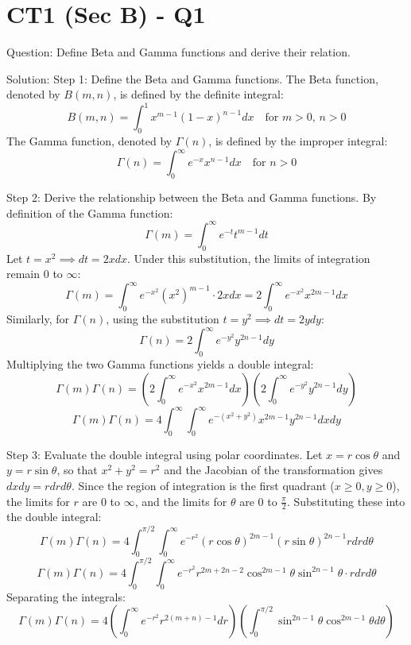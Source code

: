 \documentclass[11pt, a4paper]{article}
\begin{document}

\section*{CT1 (Sec B) - Q1}
Question:
Define Beta and Gamma functions and derive their relation.

Solution:
Step 1: Define the Beta and Gamma functions.
The Beta function, denoted by \(B(m, n)\), is defined by the definite integral:
\[
B(m, n) = \int_{0}^{1} x^{m-1} (1-x)^{n-1} dx \quad \text{for } m > 0, \, n > 0
\]
The Gamma function, denoted by \(\Gamma(n)\), is defined by the improper integral:
\[
\Gamma(n) = \int_{0}^{\infty} e^{-x} x^{n-1} dx \quad \text{for } n > 0
\]

Step 2: Derive the relationship between the Beta and Gamma functions.
By definition of the Gamma function:
\[
\Gamma(m) = \int_{0}^{\infty} e^{-t} t^{m-1} dt
\]
Let \(t = x^2 \implies dt = 2x dx\). Under this substitution, the limits of integration remain \(0\) to \(\infty\):
\[
\Gamma(m) = \int_{0}^{\infty} e^{-x^2} (x^2)^{m-1} \cdot 2x dx = 2 \int_{0}^{\infty} e^{-x^2} x^{2m-1} dx
\]
Similarly, for \(\Gamma(n)\), using the substitution \(t = y^2 \implies dt = 2y dy\):
\[
\Gamma(n) = 2 \int_{0}^{\infty} e^{-y^2} y^{2n-1} dy
\]
Multiplying the two Gamma functions yields a double integral:
\[
\Gamma(m)\Gamma(n) = \left( 2 \int_{0}^{\infty} e^{-x^2} x^{2m-1} dx \right) \left( 2 \int_{0}^{\infty} e^{-y^2} y^{2n-1} dy \right)
\]
\[
\Gamma(m)\Gamma(n) = 4 \int_{0}^{\infty} \int_{0}^{\infty} e^{-(x^2+y^2)} x^{2m-1} y^{2n-1} dx dy
\]

Step 3: Evaluate the double integral using polar coordinates.
Let \(x = r \cos\theta\) and \(y = r \sin\theta\), so that \(x^2 + y^2 = r^2\) and the Jacobian of the transformation gives \(dx dy = r dr d\theta\).
Since the region of integration is the first quadrant (\(x \ge 0, y \ge 0\)), the limits for \(r\) are \(0\) to \(\infty\), and the limits for \(\theta\) are \(0\) to \(\frac{\pi}{2}\).
Substituting these into the double integral:
\[
\Gamma(m)\Gamma(n) = 4 \int_{0}^{\pi/2} \int_{0}^{\infty} e^{-r^2} (r \cos\theta)^{2m-1} (r \sin\theta)^{2n-1} r dr d\theta
\]
\[
\Gamma(m)\Gamma(n) = 4 \int_{0}^{\pi/2} \int_{0}^{\infty} e^{-r^2} r^{2m+2n-2} \cos^{2m-1}\theta \sin^{2n-1}\theta \cdot r dr d\theta
\]
Separating the integrals:
\[
\Gamma(m)\Gamma(n) = 4 \left( \int_{0}^{\infty} e^{-r^2} r^{2(m+n)-1} dr \right) \left( \int_{0}^{\pi/2} \sin^{2n-1}\theta \cos^{2m-1}\theta d\theta \right)
\]
\end{document}
